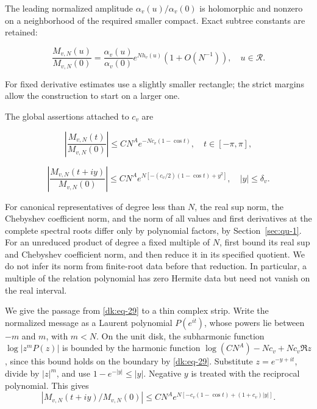 The leading normalized amplitude \(\alpha_v(u)/\alpha_v(0)\) is holomorphic
and nonzero on a neighborhood of the required smaller compact. Exact
subtree constants are retained:

\begin{equation}\label{dk:eq-28}
\frac{M_{v,N}(u)}{M_{v,N}(0)}
 =\frac{\alpha_v(u)}{\alpha_v(0)}e^{Nh_v(u)}(1+O(N^{-1})),
                     \quad u\in\mathcal R.
\end{equation}

For fixed derivative estimates use a slightly smaller rectangle;
the strict margins allow the construction to start on a larger one.

The global assertions attached to \(c_v\) are

\begin{equation}\label{dk:eq-29}
\left|\frac{M_{v,N}(t)}{M_{v,N}(0)}\right|
          \le CN^A e^{-Nc_v(1-\cos t)},
                         \quad t\in[-\pi,\pi],
\end{equation}

\begin{equation}\label{dk:eq-30}
\left|\frac{M_{v,N}(t+iy)}{M_{v,N}(0)}\right|
 \le CN^A e^{N[-(c_v/2)(1-\cos t)+y^2]},
                      \quad |y|\le\delta_v.
\end{equation}

For canonical representatives of degree less than \(N\), the real
sup norm, the Chebyshev coefficient norm, and the norm of all values
and first derivatives at the complete spectral roots differ only by
polynomial factors, by Section~\ref{sec:qu-1}. For an unreduced
product of degree a fixed multiple of \(N\), first bound its real
sup and Chebyshev coefficient norm, and then reduce it in its specified
quotient. We do not infer its norm from finite-root data before that
reduction. In particular, a multiple of the relation polynomial has
zero Hermite data but need not vanish on the real interval.

We give the passage from \eqref{dk:eq-29} to a thin complex strip.
Write the normalized message as a Laurent polynomial
\(P(e^{it})\), whose powers lie between \(-m\) and \(m\),
with \(m<N\). On the unit disk, the subharmonic function
\(\log|z^mP(z)|\) is bounded by the harmonic function
\(\log(CN^A)-Nc_v+Nc_v\Re z\), since this bound holds
on the boundary by \eqref{dk:eq-29}. Substitute
\(z=e^{-y+it}\), divide by \(|z|^m\), and use
\(1-e^{-|y|}\le |y|\). Negative \(y\) is treated with the
reciprocal polynomial. This gives
\begin{equation}\label{dk:eq-31}
|M_{v,N}(t+iy)/M_{v,N}(0)|
 \le CN^A e^{N[-c_v(1-\cos t)+(1+c_v)|y|]}.
\end{equation}

